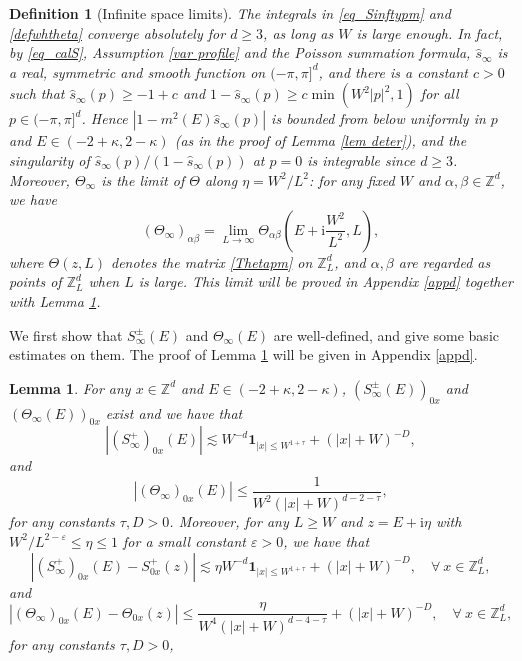 \documentclass{article}
\newcommand{\1}{\mathds{1}}
\numberwithin{equation}{section}
\newcommand{\al}{\alpha}
\newcommand{\be}{\begin{equation}}
\newcommand{\ee}{\end{equation}}
\newcommand{\e}{{\varepsilon}}
\newcommand{\wh}{\widehat}
\newcommand{\ii}{\mathrm{i}} %
\renewcommand{\leq}{\leqslant}
\renewcommand{\geq}{\geqslant}
\renewcommand{\le}{\leq}
\renewcommand{\ge}{\geq}
\newcommand{\Z}{\mathbb{Z}}
\DeclareMathOperator{\OO}{O}
\theoremstyle{plain} %
\newtheorem{lemma}[theorem]{Lemma}
\newtheorem{definition}[theorem]{Definition}
\theoremstyle{remark}
\newcommand{\cor}{\color{red}}
\newcommand{\nc}{\normalcolor}
\begin{document}
\begin{definition}[Infinite space limits]
The integrals in \eqref{eq_Sinftypm} and \eqref{defwhtheta} converge absolutely for $d\ge 3$, as long as $W$ is large enough. In fact, by \eqref{eq_calS}, Assumption \ref{var profile} and the Poisson summation formula, $\wh s_\infty$ is a real, symmetric and smooth function on $(-\pi,\pi]^d$, and there is a constant $c>0$ such that $\wh s_\infty(p)\ge -1+c$ and $1-\wh s_\infty(p)\ge c\min(W^2|p|^2,1)$ for all $p\in (-\pi,\pi]^d$. Hence $|1-m^2(E)\wh s_\infty(p)|$ is bounded from below uniformly in $p$ and $E\in (-2+\kappa,2-\kappa)$ (as in the proof of Lemma \ref{lem deter}), and the singularity of $\wh s_\infty(p)/(1-\wh s_\infty(p))$ at $p=0$ is integrable since $d\ge 3$. Moreover, $\Theta_\infty$ is the limit of $\Theta$ along $\eta=W^2/L^2$: for any fixed $W$ and $\al,\beta\in\Z^d$, we have
$$(\Theta_\infty)_{\al\beta}=\lim_{ L \to \infty }  \Theta_{\al\beta}\left(E+\ii \frac{W^2}{ L^2},  L\right),$$
where $\Theta(z,L)$ denotes the matrix \eqref{Thetapm} on $\Z_L^d$, and $\al,\beta$ are regarded as points of $\Z_L^d$ when $L$ is large. This limit will be proved in Appendix \ref{appd} together with Lemma \ref{lem esthatTheta}.
\end{definition}



We first show that $S^\pm_\infty(E)$ and $\Theta_\infty(E)$ are well-defined, and give some basic estimates on them. The proof of Lemma \ref{lem esthatTheta} will be given in Appendix \ref{appd}. 
\begin{lemma}\label{lem esthatTheta}
For any $x\in \Z^d$ and $E\in (-2+\kappa,2-\kappa)$, $(S^\pm_\infty(E))_{0x}$ and $(\Theta_\infty(E))_{0x}$ exist and we have that
\be\label{S+xy1}
 |(S^+_\infty)_{0x}(E)| \lesssim   W^{-d} \mathbf 1_{|x|\le W^{1+\tau}} + \left(|x|+W\right)^{-D},
\ee
and 
\be\label{Theta-wh1}
|(\Theta_\infty)_{0x}(E)|\le  \frac{1}{W^2\left(|x|+W\right)^{ d-2 -\tau }} ,
\ee
for any constants $\tau, D>0$. Moreover, for any $L\ge W$ and $z=E+\ii\eta$ with $ {W^{2}}/{L^{2-\e}}\le \eta\le 1$ for a small constant $\e>0$, we have that
\be\label{S+xy2}
|(S^+_\infty)_{0x}(E)-  S^{+}_{0x}(z)| \lesssim \eta W^{-d}\mathbf 1_{|x|\le W^{1+\tau}} + \left(|x|+W\right)^{-D},\quad \forall \ x\in \Z_L^d,  %
\ee
and 
\be\label{Theta-wh}
  |(\Theta_\infty)_{0x}(E)-\Theta_{0x}(z)|\le \frac{\eta  }{W^4(|x|+W)^{d-4-\tau}}+\left(|x|+W\right)^{-D},\quad \forall \ x\in \Z_L^d,  
\ee
for any constants $\tau,D>0$,
\end{lemma}
\end{document}
